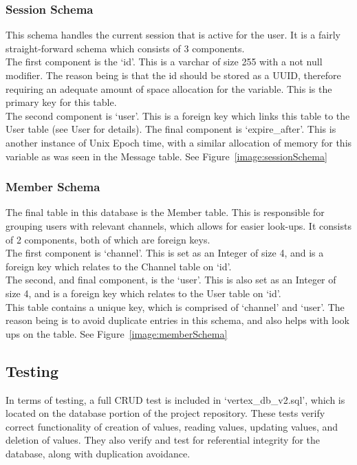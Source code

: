 \subsubsection{Session Schema}
This schema handles the current session that is active for the user. It is a fairly straight-forward schema which consists of 3 components.
\\ The first component is the ‘id’. This is a varchar of size 255 with a not null modifier. The reason being is that the id should be stored as a UUID, therefore requiring an adequate amount of space allocation for the variable. This is the primary key for this table.
\\ The second component is ‘user’. This is a foreign key which links this table to the User table (see User for details).
The final component is ‘expire\_after’. This is another instance of Unix Epoch time, with a similar allocation of memory for this variable as was seen in the Message table. 
See Figure~\ref{image:sessionSchema}

\subsubsection{Member Schema}
The final table in this database is the Member table. This is responsible for grouping users with relevant channels, which allows for easier look-ups. It consists of 2 components, both of which are foreign keys.
\\ The first component is ‘channel’. This is set as an Integer of size 4, and is a  foreign key which relates to the Channel table on ‘id’.
\\ The second, and final component, is the ‘user’. This is also set as an Integer of size 4, and is a foreign key which relates to the User table on ‘id’.
\\ This table contains a unique key, which is comprised of  ‘channel’ and ‘user’. The reason being is to avoid duplicate entries in this schema, and also helps with look ups on the table.
See Figure~\ref{image:memberSchema}

\subsection{Testing}
In terms of testing, a full CRUD test is included in ‘vertex\_db\_v2.sql’, which is located on the database portion of the project repository. These tests verify correct functionality of creation of values, reading values, updating values, and deletion of values. They also verify and test for referential integrity for the database, along with duplication avoidance.

